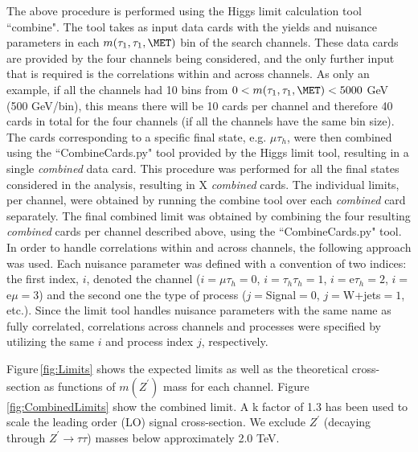The above procedure is performed using the Higgs limit calculation tool ``combine". The tool takes as input data cards with the yields and nuisance parameters in 
each $m(\tau_{1},\tau_{1},\MET)$ bin of the search channels. These data cards are provided by the four channels being considered, and the only further input that 
is required is the correlations within and across channels. As only an example, if all the channels had 10 bins from $0 < m(\tau_{1},\tau_{1},\MET) < 5000$ GeV 
(500 GeV/bin), this means there will be 10 cards per channel and therefore 40 cards in total for the four channels (if all the channels have the same bin size).
The cards corresponding to a specific final state, e.g. $\mu\tau_{h}$, were then combined using the ``CombineCards.py" tool provided by the Higgs limit tool, 
resulting in a single \textit{combined} data card. This procedure was performed for all the final states considered in the analysis, resulting in 
X \textit{combined} cards. The individual limits, per channel, were obtained by running the combine tool over each \textit{combined} card separately. The final 
combined limit was obtained by combining the four resulting \textit{combined} cards per channel described above, using the ``CombineCards.py" tool. In order to 
handle correlations within and across channels, the following approach was used. Each nuisance parameter was defined with a convention of two indices: the first 
index, $i$, denoted the channel ($i=\mu\tau_{h}=0$, $i=\tau_{h}\tau_{h}=1$, $i=$e$\tau_{h}=2$, $i=$e$\mu=3$) and the second one the type of process 
($j=$Signal$=0$, $j=$W+jets$=1$, etc.). Since the limit tool handles nuisance parameters with the same name as fully correlated, correlations across channels and 
processes were specified by utilizing the same $i$ and process index $j$, respectively.

Figure\,\ref{fig:Limits} shows the expected limits as well as the theoretical cross-section as functions of $m(Z^{\prime})$ mass for each channel. 
Figure\,\ref{fig:CombinedLimits} show the combined limit. A k factor of 1.3 has been used to scale the leading order (LO) signal cross-section. 
We exclude $Z^{\prime}$ (decaying through $Z^{\prime}\to\tau\tau$) masses below approximately 2.0 TeV. 

